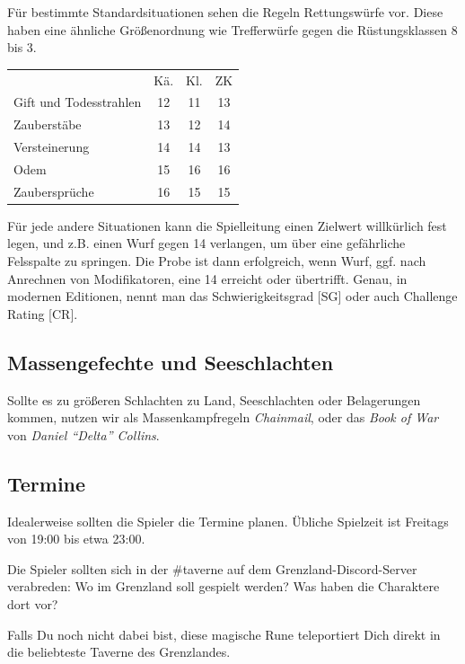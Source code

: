 \documentclass[11pt]{wbzine}
\begin{document}
\begin{multicols}{2}
    Für bestimmte Standardsituationen sehen die Regeln Rettungswürfe
    vor. Diese haben eine ähnliche Größenordnung wie Trefferwürfe
    gegen die Rüstungsklassen 8 bis 3.

    \begin{tabularx}{\columnwidth}{Yccc}
            & Kä. & Kl. & ZK \\
	Gift und Todesstrahlen & 12 & 11 & 13 \\
	Zauberstäbe & 13 & 12 & 14 \\
	Versteinerung & 14 & 14 & 13 \\
	Odem & 15 & 16 & 16 \\
	Zaubersprüche & 16 & 15 & 15 \\ 
    \end{tabularx}

    Für jede andere Situationen kann die Spielleitung einen Zielwert
willkürlich fest legen, und z.B. einen Wurf gegen 14 verlangen, um über eine
gefährliche Felsspalte zu springen. Die Probe ist dann erfolgreich, wenn Wurf,
ggf. nach Anrechnen von Modifikatoren, eine 14 erreicht oder übertrifft.
Genau, in modernen Editionen, nennt man das Schwierigkeitsgrad [SG] oder auch
Challenge Rating [CR].
    

    \subsection{Massengefechte und Seeschlachten}

    Sollte es zu größeren Schlachten zu Land, Seeschlachten oder
    Belagerungen kommen, nutzen wir als Massenkampfregeln 
    \textit{Chainmail}, oder das \textit{Book of War} von
    \textit{Daniel ``Delta'' Collins}.


\subsection{Termine}

    Idealerweise sollten die Spieler die Termine planen.
    Übliche Spielzeit ist Freitags von 19:00 bis etwa 23:00.

Die Spieler sollten sich in der \#taverne auf dem Grenzland-Discord-Server verabreden:
Wo im Grenzland soll gespielt werden? Was haben die Charaktere dort vor?

Falls Du noch nicht dabei bist, diese magische Rune teleportiert
Dich direkt in die beliebteste Taverne des Grenzlandes.



\end{multicols}
\end{document}
